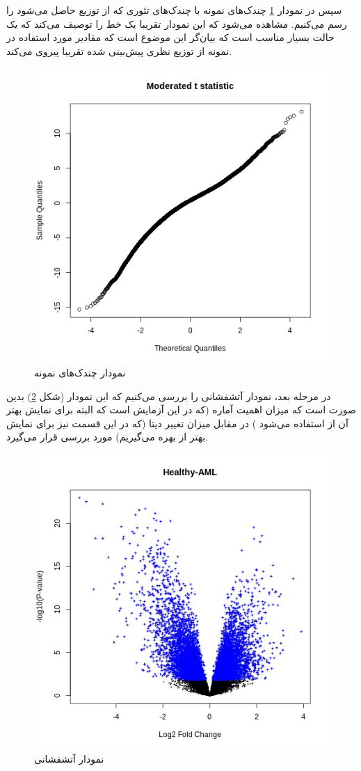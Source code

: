 \documentclass{article}
\begin{document}
سپس در نمودار \ref{fig:qq} چندک‌های   نمونه با چندک‌های تئوری که از توزیع
حاصل می‌شود را رسم می‌کنیم. مشاهده می‌شود که این نمودار تقریبا یک خط را توصیف می‌کند که یک حالت بسیار مناسب است که بیان‌گر این موضوع است که مقادیر مورد استفاده در نمونه از توزیع نظری پیش‌بینی شده تقریبا پیروی می‌کند.

\begin{figure}[h!]
	\centering
	\includegraphics[width=0.5\columnwidth]{figs/qq.png}
	\caption{نمودار چندک‌های نمونه}
	\label{fig:qq}
\end{figure}

در مرحله بعد، نمودار آتشفشانی
را بررسی می‌کنیم که این نمودار (شکل \ref{fig:volcano}) بدین صورت است که میزان اهمیت آماره (که در این آزمایش 
است که البته برای نمایش بهتر آن از 
استفاده می‌شود
)
در مقابل میزان تغییر دیتا (که در این قسمت نیز برای نمایش بهتر 
از 
بهره می‌گیریم)
مورد بررسی قرار می‌گیرد.

\begin{figure}[h!]
	\centering
	\includegraphics[width=0.5\columnwidth]{figs/volcano.png}
	\caption{نمودار آتشفشانی}
	\label{fig:volcano}
\end{figure}
\end{document}

